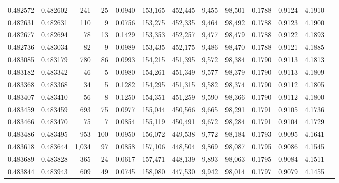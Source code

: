\begin{tabular}{rrrrrrrrrrrrr}
0.482572 & 0.482602 &   241 &    25 &                                     0.0940 & 153,165 & 452,445 &   9,455 &  98,501 & 0.1788 & 0.9124 & 4.1910 \\
0.482631 & 0.482631 &   110 &     9 &                                     0.0756 & 153,275 & 452,335 &   9,464 &  98,492 & 0.1788 & 0.9123 & 4.1900 \\
0.482677 & 0.482694 &    78 &    13 &                                     0.1429 & 153,353 & 452,257 &   9,477 &  98,479 & 0.1788 & 0.9122 & 4.1893 \\
0.482736 & 0.483034 &    82 &     9 &                                     0.0989 & 153,435 & 452,175 &   9,486 &  98,470 & 0.1788 & 0.9121 & 4.1885 \\
0.483085 & 0.483179 &   780 &    86 &                                     0.0993 & 154,215 & 451,395 &   9,572 &  98,384 & 0.1790 & 0.9113 & 4.1813 \\
0.483182 & 0.483342 &    46 &     5 &                                     0.0980 & 154,261 & 451,349 &   9,577 &  98,379 & 0.1790 & 0.9113 & 4.1809 \\
0.483368 & 0.483368 &    34 &     5 &                                     0.1282 & 154,295 & 451,315 &   9,582 &  98,374 & 0.1790 & 0.9112 & 4.1805 \\
0.483407 & 0.483410 &    56 &     8 &                                     0.1250 & 154,351 & 451,259 &   9,590 &  98,366 & 0.1790 & 0.9112 & 4.1800 \\
0.483459 & 0.483459 &   693 &    75 &                                     0.0977 & 155,044 & 450,566 &   9,665 &  98,291 & 0.1791 & 0.9105 & 4.1736 \\
0.483466 & 0.483470 &    75 &     7 &                                     0.0854 & 155,119 & 450,491 &   9,672 &  98,284 & 0.1791 & 0.9104 & 4.1729 \\
0.483486 & 0.483495 &   953 &   100 &                                     0.0950 & 156,072 & 449,538 &   9,772 &  98,184 & 0.1793 & 0.9095 & 4.1641 \\
0.483618 & 0.483644 & 1,034 &    97 &                                     0.0858 & 157,106 & 448,504 &   9,869 &  98,087 & 0.1795 & 0.9086 & 4.1545 \\
0.483689 & 0.483828 &   365 &    24 &                                     0.0617 & 157,471 & 448,139 &   9,893 &  98,063 & 0.1795 & 0.9084 & 4.1511 \\
0.483844 & 0.483943 &   609 &    49 &                                     0.0745 & 158,080 & 447,530 &   9,942 &  98,014 & 0.1797 & 0.9079 & 4.1455 \\

\end{tabular}
